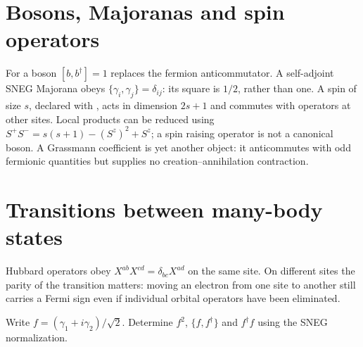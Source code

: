 \section{Bosons, Majoranas and spin operators}
For a boson $[b,b^\dagger]=1$ replaces the fermion anticommutator.
A self-adjoint SNEG Majorana obeys $\{\gamma_i,\gamma_j\}=\delta_{ij}$:
its square is $1/2$, rather than one. A spin of size $s$, declared with
, acts in dimension $2s+1$ and commutes with
operators at other sites. Local products can be reduced using
$S^+S^-=s(s+1)-(S^z)^2+S^z$; a spin raising operator is not a
canonical boson. A Grassmann coefficient is yet another object:
it anticommutes with odd fermionic quantities but supplies no
creation--annihilation contraction.
\section{Transitions between many-body states}
Hubbard operators obey $X^{ab}X^{cd}=\delta_{bc}X^{ad}$ on the
same site. On different sites the parity of the transition matters:
moving an electron from one site to another still carries a Fermi
sign even if individual orbital operators have been eliminated.
\begin{exercise}\label{ex:majorana}
Write $f=(\gamma_1+i\gamma_2)/\sqrt2$. Determine $f^2$,
$\{f,f^\dagger\}$ and $f^\dagger f$ using the SNEG normalization.
\end{exercise}

